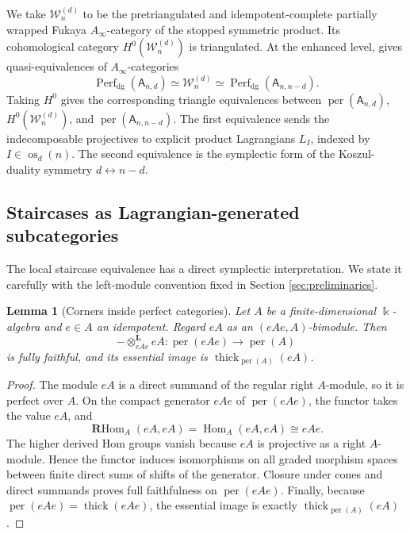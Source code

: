 \documentclass[12pt,a4paper,english,reqno]{amsart}
\theoremstyle{plain}
\newtheorem{lemma}[theorem]{Lemma}
\theoremstyle{definition}
\newcommand{\kk}{\Bbbk}
\newcommand{\perf}{\operatorname{per}}
\newcommand{\Hom}{\operatorname{Hom}}
\newcommand{\RHom}{\operatorname{\mathbf{R}Hom}}
\newcommand{\thick}{\operatorname{thick}}
\newcommand{\os}{\operatorname{os}}
\newcommand{\Wcat}{\mathcal W}
\begin{document}
We take $\Wcat_n^{(d)}$ to be the pretriangulated and idempotent-complete
partially wrapped Fukaya $A_\infty$-category of the stopped symmetric
product.  Its cohomological category $H^0(\Wcat_n^{(d)})$ is triangulated.
At the enhanced level, \cite[Theorems~1 and~2]{DJL} gives
quasi-equivalences of $A_\infty$-categories
\begin{equation}
 \operatorname{Perf}_{\mathrm{dg}}(\mathsf A_{n,d})
 \simeq\Wcat_n^{(d)}
 \simeq\operatorname{Perf}_{\mathrm{dg}}(\mathsf A_{n,n-d}).
\label{eq:DJL-equivalences}
\end{equation}
Taking $H^0$ gives the corresponding triangle equivalences between
$\perf(\mathsf A_{n,d})$, $H^0(\Wcat_n^{(d)})$, and
$\perf(\mathsf A_{n,n-d})$.
The first equivalence sends the indecomposable projectives to explicit
product Lagrangians $L_I$, indexed by
$I\in\os_d(n)$.  The second equivalence is the symplectic form of the
Koszul-duality symmetry $d\leftrightarrow n-d$.

\subsection{Staircases as Lagrangian-generated subcategories}

The local staircase equivalence has a direct symplectic interpretation.  We
state it carefully with the left-module convention fixed in
Section \ref{sec:preliminaries}.

\begin{lemma}[Corners inside perfect categories]
\label{lem:corner-perfect}
Let $A$ be a finite-dimensional $\kk$-algebra and $e\in A$ an
idempotent.  Regard $eA$ as an $(eAe,A)$-bimodule.  Then
\[
 -\otimes_{eAe}^{\mathbf L}eA\colon
 \perf(eAe)\longrightarrow\perf(A)
\]
is fully faithful, and its essential image is
$\thick_{\perf(A)}(eA)$.
\end{lemma}

\begin{proof}
The module $eA$ is a direct summand of the regular right $A$-module, so
it is perfect over $A$.  On the compact generator $eAe$ of
$\perf(eAe)$, the functor takes the value $eA$, and
\[
 \RHom_A(eA,eA)=\Hom_A(eA,eA)\cong eAe.
\]
The higher derived Hom groups vanish because $eA$ is projective as a right
$A$-module.  Hence the functor induces isomorphisms on all graded
morphism spaces between finite direct sums of shifts of the generator.
Closure under cones and direct summands proves full faithfulness on
$\perf(eAe)$.  Finally, because $\perf(eAe)=\thick(eAe)$, the essential
image is exactly $\thick_{\perf(A)}(eA)$.
\end{proof}
\end{document}
